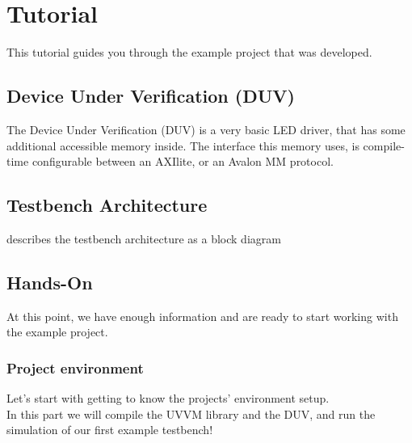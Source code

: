 \section{Tutorial}

This tutorial guides you through the example project that was developed.

\subsection{Device Under Verification (DUV)}

The Device Under Verification (DUV) is a very basic LED driver, that has some additional accessible memory inside. The interface this memory uses, is compile-time configurable between an AXIlite, or an Avalon MM protocol.

\subsection{Testbench Architecture}

describes the testbench architecture as a block diagram

\subsection{Hands-On}

At this point, we have enough information and are ready to start working with the example project.

\subsubsection{Project environment}

Let's start with getting to know the projects' environment setup. \\
In this part we will compile the UVVM library and the DUV, and run the simulation of our first example testbench!

